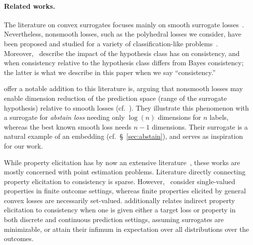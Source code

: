 \documentclass[11pt]{article}
\begin{document}
\paragraph{Related works.}
The literature on convex surrogates focuses mainly on smooth surrogate losses~\citep{crammer2001algorithmic,bartlett2006convexity,bartlett2008classification, duchi2018multiclass, williamson2016composite, reid2010composite,menon2019multilabel,zhang2020convex,bao2020calibrated}.
Nevertheless, nonsmooth losses, such as the polyhedral losses we consider, have been proposed and studied for a variety of classification-like problems~\citep{yang2018consistency,yu2018lovasz,lapin2015top}.
Moreover,~\citet{zhang2020bayes} describe the impact of the hypothesis class has on consistency, and when consistency relative to the hypothesis class differs from Bayes consistency; the latter is what we describe in this paper when we say ``consistency.''

\citet{ramaswamy2018consistent} offer a notable addition to this literature is, arguing that nonsmooth losses may enable dimension reduction of the prediction space (range of the surrogate hypothesis) relative to smooth losses (cf.~\citep[Section 1.2]{ramaswamy2018consistent}).
They illustrate this phenomenon with a surrogate for \emph{abstain loss} needing only $\log(n)$ dimensions for $n$ labels, whereas the best known smooth loss needs $n-1$ dimensions.
Their surrogate is a natural example of an embedding (cf.~\S~\ref{sec:abstain}), and serves as inspiration for our work.


While property elicitation has by now an extensive literature~\citep{savage1971elicitation,osband1985information-eliciting,lambert2008eliciting,gneiting2011making,steinwart2014elicitation,frongillo2015vector-valued,fissler2016higher,lambert2018elicitation}, these works are mostly concerned with point estimation problems.
Literature directly connecting property elicitation to consistency is sparse.
However,~\citet{agarwal2015consistent} consider single-valued properties in finite outcome settings, whereas finite properties elicited by general convex losses are necessarily set-valued.
\citet{finocchiaro2021unifying} additionally relates indirect property elicitation to consistency when one is given either a target loss or property in both discrete and continuous prediction settings, assuming surrogates are minimizable, or attain their infimum in expectation over all distributions over the outcomes.

\end{document}
